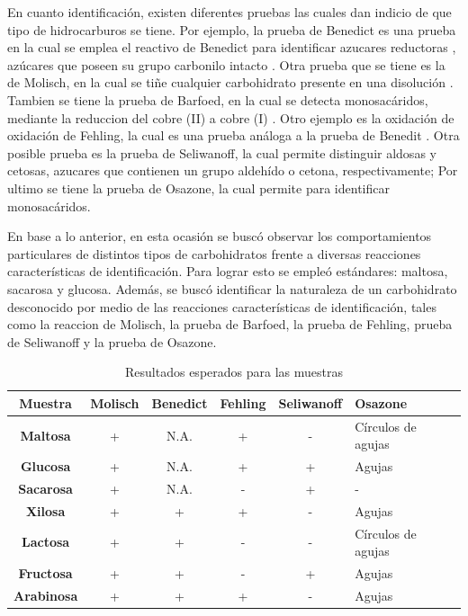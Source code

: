 \documentclass[fleqn,10pt]{SelfArx}
\begin{document}
	En cuanto identificación, existen diferentes pruebas las cuales dan indicio de que tipo de hidrocarburos se tiene. Por ejemplo, la prueba de Benedict es una prueba en la cual se emplea el reactivo de Benedict para identificar azucares reductoras \cite{raymond2013general}, azúcares que poseen su grupo carbonilo intacto \cite{nelson2008lehninger}. Otra prueba que se tiene es la de Molisch, en la cual se tiñe cualquier carbohidrato presente en una disolución \cite{harisha2005introduction}. Tambien se tiene la prueba de Barfoed, en la cual se detecta monosacáridos, mediante la reduccion del cobre (II) a cobre (I)  \cite{barfoed1873ueber}. Otro ejemplo es la oxidación de oxidación de Fehling, la cual es una prueba análoga a la prueba de Benedit \cite{bonner1976quimica}. Otra posible prueba es la prueba de Seliwanoff, la cual permite distinguir aldosas y cetosas, azucares que contienen un grupo aldehído o cetona, respectivamente; Por ultimo se tiene la prueba de Osazone, la cual permite para identificar monosacáridos.
	
	En base a lo anterior, en esta ocasión se buscó observar los comportamientos particulares de distintos tipos de carbohidratos frente a diversas reacciones características de identificación. Para lograr esto se empleó estándares: maltosa, sacarosa y glucosa. Además, se buscó identificar la naturaleza de un carbohidrato desconocido por medio de las reacciones características de identificación, tales como la reaccion de Molisch, la prueba de Barfoed, la prueba de Fehling, prueba de Seliwanoff y la prueba de Osazone.
	\begin{table}[h]
		\centering
		\caption{Resultados esperados para las muestras}
		\label{tb}
		\begin{tabular}{c|ccccp{1.5cm}}
			\hline
			\textbf{Muestra} & \textbf{Molisch} & \textbf{Benedict} & \textbf{Fehling} & \textbf{Seliwanoff} & \textbf{Osazone} \\
			\hline
			\textbf{Maltosa} & + & N.A. & + & - & Círculos de agujas \\
			\textbf{Glucosa} & + & N.A. & + & + & Agujas \\
			\textbf{Sacarosa} & + & N.A. & - & + & - \\
			\hline
			\textbf{Xilosa} & + & + & + & - & Agujas \\
			\textbf{Lactosa} & + & + & - & - & Círculos de agujas \\
			\textbf{Fructosa} & + & + & - & + & Agujas \\
			\textbf{Arabinosa} & + & + & + & - & Agujas \\
			\hline
		\end{tabular}
	\end{table}
	
\end{document}
